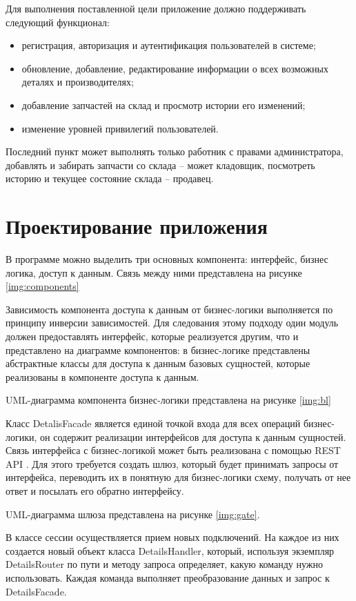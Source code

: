 Для выполнения поставленной цели приложение должно поддерживать следующий функционал: 
\begin{itemize}
	\item регистрация, авторизация и аутентификация пользователей в системе;
	\item обновление, добавление, редактирование информации о всех возможных деталях и производителях;
	\item добавление запчастей на склад и просмотр истории его изменений;
	\item изменение уровней привилегий пользователей.
\end{itemize}

Последний пункт может выполнять только работник с правами администратора, добавлять и забирать запчасти со склада -- может кладовщик, посмотреть историю и текущее состояние склада -- продавец.

\section{Проектирование приложения}

В программе можно выделить три основных компонента: интерфейс, бизнес логика, доступ к данным. Связь между ними представлена на рисунке \ref{img:components}


Зависимость компонента доступа к данным от бизнес-логики выполняется по принципу инверсии зависимостей. Для следования этому подходу один модуль должен предоставлять интерфейс, которые реализуется другим, что и представлено на диаграмме компонентов: в бизнес-логике представлены абстрактные классы для доступа к данным базовых сущностей, которые реализованы в компоненте доступа к данным.

UML-диаграмма компонента бизнес-логики представлена на рисунке \ref{img:bl}


Класс DetalisFacade является единой точкой входа для всех операций бизнес-логики, он содержит реализации интерфейсов для доступа к данным сущностей. Связь интерфейса с бизнес-логикой может быть реализована с помощью REST API \cite{rest-api}. Для этого требуется создать шлюз, который будет принимать запросы от интерфейса, переводить их в понятную для бизнес-логики схему, получать от нее ответ и посылать его обратно интерфейсу.

UML-диаграмма шлюза представлена на рисунке \ref{img:gate}.


В классе сессии осуществляется прием новых подключений. На каждое из них создается новый объект класса DetailsHandler, который, используя экземпляр DetailsRouter по пути и методу запроса определяет, какую команду нужно использовать. Каждая команда выполняет преобразование данных и запрос к DetailsFacade.
